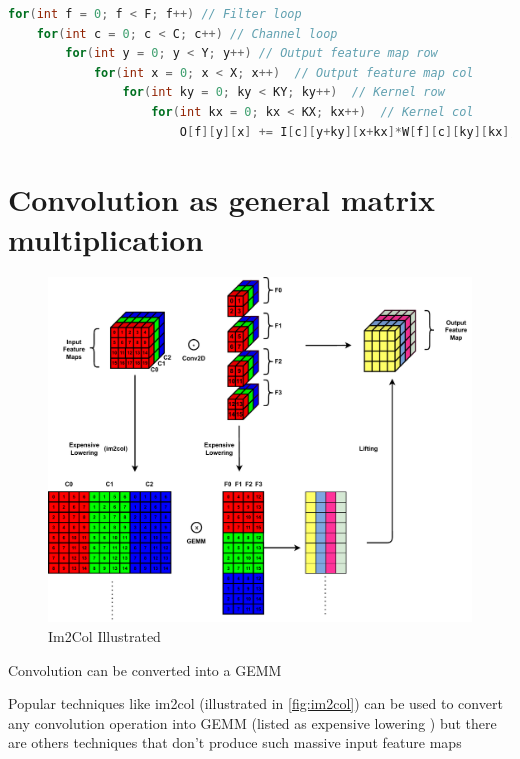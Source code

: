 \begin{minipage}{\linewidth}
    \begin{lstlisting}[language=C, caption=Convolution implemented as nested loops, label={lst:conv_loop}]
for(int f = 0; f < F; f++) // Filter loop
    for(int c = 0; c < C; c++) // Channel loop
        for(int y = 0; y < Y; y++) // Output feature map row
            for(int x = 0; x < X; x++)  // Output feature map col
                for(int ky = 0; ky < KY; ky++)  // Kernel row
                    for(int kx = 0; kx < KX; kx++)  // Kernel col
                        O[f][y][x] += I[c][y+ky][x+kx]*W[f][c][ky][kx];
    \end{lstlisting}
\end{minipage}

\newpage

\section{Convolution as general matrix multiplication}
\label{chap:intro:conv_operation}

\begin{figure}[ht]
    \centering
    \includegraphics[scale=0.6]{fig/Im2Col.pdf}
    \caption{Im2Col Illustrated}
    \label{fig:im2col}
\end{figure}

Convolution can be converted into a \ac{GEMM}

Popular techniques like im2col (illustrated in \autoref{fig:im2col}) can be used
to convert any convolution operation into \ac{GEMM} (listed as expensive
lowering \cite{cafe_con_troll}) but there are others techniques that don't
produce such massive input feature maps


